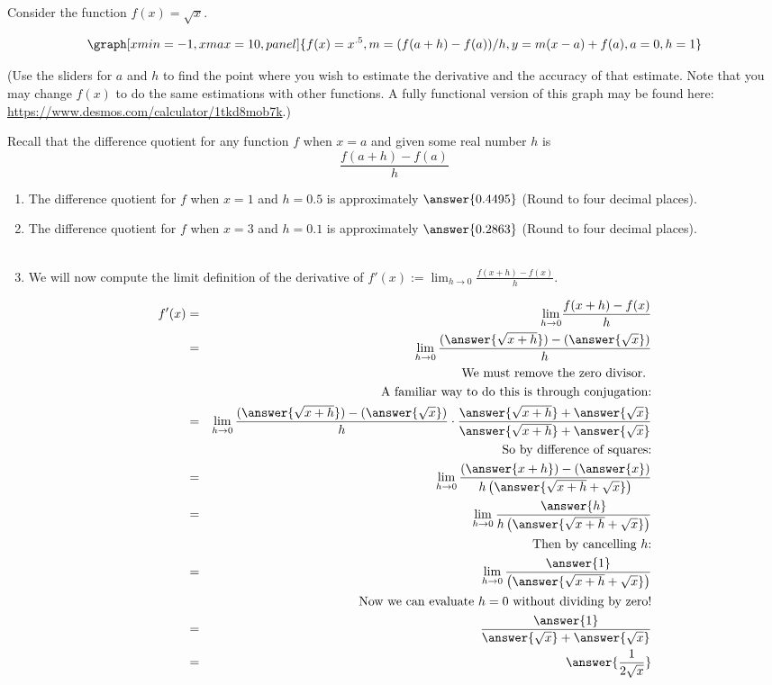 \documentclass{ximera}
\begin{document}
\begin{question}
Consider the function $f(x)=\sqrt{x}$.  

\begin{onlineOnly}
$$\graph[xmin=-1,xmax=10, panel]{f(x)=x^{.5},m=(f(a+h)-f(a))/h,  y=m(x-a)+f(a), a=0, h=1}$$
\end{onlineOnly}
(Use the sliders for $a$ and $h$ to find the point where you wish to estimate the derivative and the accuracy of that estimate.  Note that you may change $f(x)$ to do the same estimations with other functions.  A fully functional version of this graph may be found here: \url{https://www.desmos.com/calculator/1tkd8mob7k}.)

Recall that the difference quotient for any function $f$ when $x=a$ and given some real number $h$ is $$\frac{f(a+h)-f(a)}{h}$$

\begin{enumerate}
\item The difference quotient for $f$ when $x=1$ and $h=0.5$ is approximately $\answer{0.4495}$ (Round to four decimal places). 
\item The difference quotient for $f$ when $x=3$ and $h=0.1$ is approximately $\answer{0.2863}$ (Round to four decimal places).\\ \\
\item We will now compute the limit definition of the derivative of $ f'(x):={\displaystyle \lim_{h\to 0}} \frac{f(x+h)-f(x)}{h}$.

\begin{eqnarray*}
f'(x)&=&{\displaystyle \lim_{h\to 0}} \frac{f(x+h)-f(x)}{h}\\
&=& \displaystyle \lim_{h\to 0}\frac{(\answer{\sqrt{x+h}})-(\answer{\sqrt{x}})}{h}\\
&&\text{We must remove the zero divisor. }\\ && \text{A familiar way to do this is through conjugation:}\\
&=& \displaystyle \lim_{h\to 0}\frac{(\answer{\sqrt{x+h}})-(\answer{\sqrt{x}})}{h}\cdot \frac{\answer{\sqrt{x+h}}+\answer{\sqrt{x}}}{\answer{\sqrt{x+h}}+\answer{\sqrt{x}}}\\
&&\text{So by difference of squares:}\\
&=& \displaystyle \lim_{h\to 0}\frac{(\answer{x+h})-(\answer{x})}{h\left(\answer{\sqrt{x+h}+\sqrt{x}}\right)}\\
&=& \displaystyle \lim_{h\to 0}\frac{\answer{h}}{h\left(\answer{\sqrt{x+h}+\sqrt{x}}\right)}\\
&&\text{Then by cancelling $h$:}\\
&=& \displaystyle \lim_{h\to 0}\frac{\answer{1}}{\left(\answer{\sqrt{x+h}+\sqrt{x}}\right)}\\
&&\text{Now we can evaluate $h=0$ without dividing by zero!}\\
&=&\frac{\answer{1}}{\answer{\sqrt{x}}+\answer{\sqrt{x}}}\\
&=& \answer{\frac{1}{2\sqrt{x}}}
\end{eqnarray*}



\end{enumerate}
\end{question}
\end{document}
